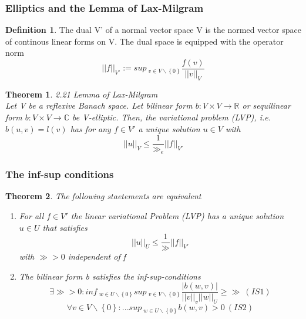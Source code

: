 \documentclass[ngerman]{article}
\newtheorem*{theorem}{Theorem}
\theoremstyle{definition}
\newtheorem*{defi}{Definition}
\theoremstyle{remark}
\newcommand{\f}[2]{\frac{#1}{#2}}							%
\newcommand{\RR}{\mathbb{R}}			%
\newcommand{\CC}{\mathbb{C}}			%
\begin{document}
  \subsubsection{Elliptics and the Lemma of Lax-Milgram}
  \begin{defi} The dual V' of a normal vector space V is the normed vector space of continous linear forms on V. The dual space is equipped with the operator norm 
    $$||f||_{V'} := sup\ _{v \in V\backslash \left\{0\right\}} \f{f(v)}{||v||_V}$$
  \end{defi}
  \begin{theorem}2.21 Lemma of Lax-Milgram\\
    Let V be a reflexive Banach space. Let bilinear form $b:V \times V \to \RR$ or sequilinear form $b:V\times V \to \CC$ be V-elliptic. Then, the variational problem (LVP), i.e. $b(u,v) = l(v)$ has for any $f \in V'$ a unique solution $u \in V$ with 
    $$||u||_V \leq \f{1}{\gg_e}||f||_{V'}$$
  \end{theorem}
  \subsubsection{ The inf-sup conditions }
  \begin{theorem}
    The following staetements are equivalent
    \begin{enumerate}
    \item For all $f \in V'$ the linear variational Problem (LVP) has a unique solution $u \in U$ that satisfies 
      $$||u||_U \leq \f{1}{\gg}||f||_{V'}$$
      with $\gg>0$ independent of f\\
    \item The bilinear form b satisfies the \emph{inf-sup-conditions}
      $$\exists \gg >0: inf\ _{w \in U \backslash\left\{0\right\} } sup\ _{v \in V \backslash \left\{0\right\}} \f{|b(w,v)|}{||v||_v||w||_U} \geq \gg \ (IS1)$$
      $$\forall v \in V \backslash\left\{0\right\} : ... sup\ _{w \in U \backslash\left\{0\right\}} b(w,v)>0 \ (IS2)$$
    \end{enumerate}
  \end{theorem}
  
  
\end{document}
